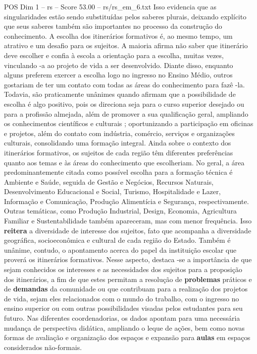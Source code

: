 \begin{textsample}{POS Dim 1 – rs – Score 53.00 – rs/rs\_em\_6.txt}
Isso evidencia que as singularidades estão sendo substituídas pelos saberes plurais, deixando explícito que seus saberes também são importantes no processo da construção do conhecimento.
A escolha dos itinerários formativos é, ao mesmo tempo, um atrativo e um desafio para os sujeitos.
A maioria afirma não saber que itinerário deve escolher e confia à escola a orientação para a escolha, muitas vezes, vinculando -a ao projeto de vida a ser desenvolvido.
Diante disso, enquanto alguns preferem exercer a escolha logo no ingresso no Ensino Médio, outros gostariam de ter um contato com todas as áreas do conhecimento para fazê -la.
Todavia, são praticamente unânimes quando afirmam que a possibilidade de escolha é algo positivo, pois os direciona seja para o curso superior desejado ou para a profissão almejada, além de promover a sua qualificação geral, ampliando os conhecimentos científicos e culturais ; oportunizando a participação em oficinas e projetos, além do contato com indústria, comércio, serviços e organizações culturais, consolidando uma formação integral.
Ainda sobre o contexto dos itinerários formativos, os sujeitos de cada região têm diferentes preferências quanto aos temas e às áreas do conhecimento que escolheriam.
No geral, a área predominantemente citada como possível escolha para a formação técnica é Ambiente e Saúde, seguida de Gestão e Negócios, Recursos Naturais, Desenvolvimento Educacional e Social, Turismo, Hospitalidade e Lazer, Informação e Comunicação, Produção Alimentícia e Segurança, respectivamente.
Outras temáticas, como Produção Industrial, Design, Economia, Agricultura Familiar e Sustentabilidade também apareceram, mas com menor frequência.
Isso \textbf{reitera} a diversidade de interesse dos sujeitos, fato que acompanha a diversidade geográfica, socioeconômica e cultural de cada região do Estado.
Também é unânime, contudo, o apontamento acerca do papel da instituição escolar que proverá os itinerários formativos.
Nesse aspecto, destaca -se a importância de que sejam conhecidos os interesses e as necessidades dos sujeitos para a proposição dos itinerários, a fim de que estes permitam a resolução de \textbf{problemas} práticos e de \textbf{demandas} da comunidade ou que contribuam para a realização dos projetos de vida, sejam eles relacionados com o mundo do trabalho, com o ingresso no ensino superior ou com outras possibilidades visadas pelos estudantes para seu futuro.
Nas diferentes coordenadorias, os dados apontam para uma necessária mudança de perspectiva didática, ampliando o leque de ações, bem como novas formas de avaliação e organização dos espaços e expansão para \textbf{aulas} em espaços considerados não-formais.

\end{textsample}
